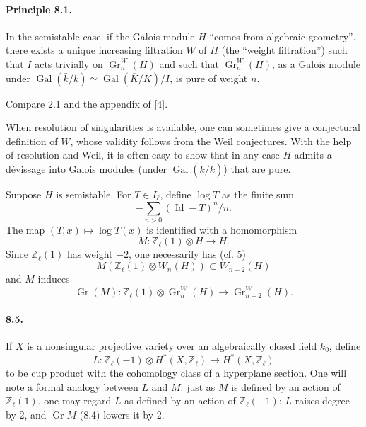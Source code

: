 \documentclass[10pt]{article}
\newcommand{\Zl}{\mathbb Z_\ell}
\newcommand{\Gr}{\operatorname{Gr}}
\newcommand{\Gal}{\operatorname{Gal}}
\newcommand{\Id}{\operatorname{Id}}
\newcommand{\barK}{\overline{K}}
\begin{document}
\paragraph{Principle 8.1.} In the semistable case, if the Galois module $H$ ``comes from algebraic geometry'', there exists a unique increasing filtration $W$ of $H$ (the ``weight filtration'') such that $I$ acts trivially on $\Gr_n^W(H)$ and such that $\Gr_n^W(H)$, as a Galois module under $\Gal(\bar k/k)\simeq\Gal(\barK/K)/I$, is pure of weight $n$.

Compare 2.1 and the appendix of [4].

When resolution of singularities is available, one can sometimes give a conjectural definition of $W$, whose validity follows from the Weil conjectures. With the help of resolution and Weil, it is often easy to show that in any case $H$ admits a dévissage into Galois modules (under $\Gal(\bar k/k)$) that are pure.

Suppose $H$ is semistable. For $T\in I_\ell$, define $\log T$ as the finite sum
\[
-\sum_{n>0}(\Id-T)^n/n.
\]
The map $(T,x)\mapsto\log T(x)$ is identified with a homomorphism
\[
\tag{8.2}
M:\Zl(1)\otimes H\longrightarrow H.
\]
Since $\Zl(1)$ has weight $-2$, one necessarily has (cf. 5)
\[
\tag{8.3}
M(\Zl(1)\otimes W_n(H))\subset W_{n-2}(H)
\]
and $M$ induces
\[
\tag{8.4}
\Gr(M):\Zl(1)\otimes\Gr_n^W(H)\longrightarrow\Gr_{n-2}^W(H).
\]

\paragraph{8.5.} If $X$ is a nonsingular projective variety over an algebraically closed field $k_0$, define
\[
L:\Zl(-1)\otimes H^*(X,\Zl)\longrightarrow H^*(X,\Zl)
\]
to be cup product with the cohomology class of a hyperplane section. One will note a formal analogy between $L$ and $M$: just as $M$ is defined by an action of $\Zl(1)$, one may regard $L$ as defined by an action of $\Zl(-1)$; $L$ raises degree by $2$, and $\Gr M$ (8.4) lowers it by $2$.
\end{document}
